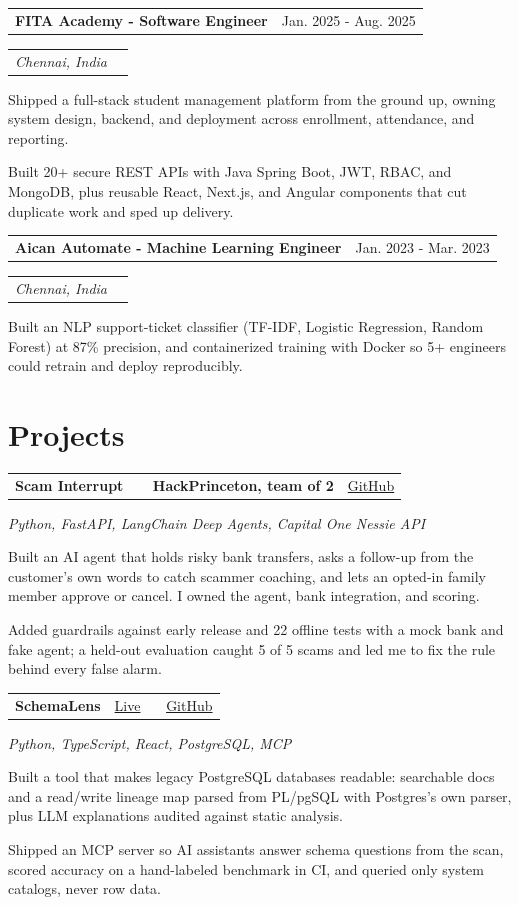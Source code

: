 \documentclass[letterpaper,10pt]{article}
\makeatletter
\newcommand{\bi}[1]{\item {\fontsize{9.2}{10.8}\selectfont #1}}
\newcommand{\role}[2]{%
  \vspace{2pt}\noindent\begin{tabular*}{\linewidth}{@{}l@{\extracolsep{\fill}}r@{}}
  \textbf{#1} & #2\\\end{tabular*}\par}
\newcommand{\sub}[2]{%
  \noindent\begin{tabular*}{\linewidth}{@{}l@{\extracolsep{\fill}}r@{}}
  \textit{\small #1} & \textit{\small #2}\\\end{tabular*}\par\vspace{-1pt}}
\newcommand{\proj}[3]{%
  \vspace{2pt}\noindent\begin{tabular*}{\linewidth}{@{}l@{\extracolsep{\fill}}r@{}}
  \textbf{#1} & #2\\\end{tabular*}\par
  {\itshape\small #3}\par\vspace{-1pt}}
\makeatother
\begin{document}
\role{FITA Academy - Software Engineer}{Jan. 2025 - Aug. 2025}
\sub{Chennai, India}{}
\begin{bullets}
  \bi{Shipped a full-stack student management platform from the ground up, owning system design, backend, and deployment across enrollment, attendance, and reporting.}
  \bi{Built 20+ secure REST APIs with Java Spring Boot, JWT, RBAC, and MongoDB, plus reusable React, Next.js, and Angular components that cut duplicate work and sped up delivery.}
\end{bullets}

\role{Aican Automate - Machine Learning Engineer}{Jan. 2023 - Mar. 2023}
\sub{Chennai, India}{}
\begin{bullets}
  \bi{Built an NLP support-ticket classifier (TF-IDF, Logistic Regression, Random Forest) at 87\% precision, and containerized training with Docker so 5+ engineers could retrain and deploy reproducibly.}
\end{bullets}

\section{Projects}
\proj{Scam Interrupt \ \textbar\ \ HackPrinceton, team of 2}{\href{https://github.com/KeerthanaDeviGovindaraj/scam_interrupt}{GitHub}}
     {Python, FastAPI, LangChain Deep Agents, Capital One Nessie API}
\begin{bullets}
  \bi{Built an AI agent that holds risky bank transfers, asks a follow-up from the customer's own words to catch scammer coaching, and lets an opted-in family member approve or cancel. I owned the agent, bank integration, and scoring.}
  \bi{Added guardrails against early release and 22 offline tests with a mock bank and fake agent; a held-out evaluation caught 5 of 5 scams and led me to fix the rule behind every false alarm.}
\end{bullets}

\proj{SchemaLens}{\href{https://web-sigma-six-99.vercel.app}{Live} \ \textbar\ \ \href{https://github.com/KeerthanaDeviGovindaraj/schemalens}{GitHub}}
     {Python, TypeScript, React, PostgreSQL, MCP}
\begin{bullets}
  \bi{Built a tool that makes legacy PostgreSQL databases readable: searchable docs and a read/write lineage map parsed from PL/pgSQL with Postgres's own parser, plus LLM explanations audited against static analysis.}
  \bi{Shipped an MCP server so AI assistants answer schema questions from the scan, scored accuracy on a hand-labeled benchmark in CI, and queried only system catalogs, never row data.}
\end{bullets}
\end{document}
